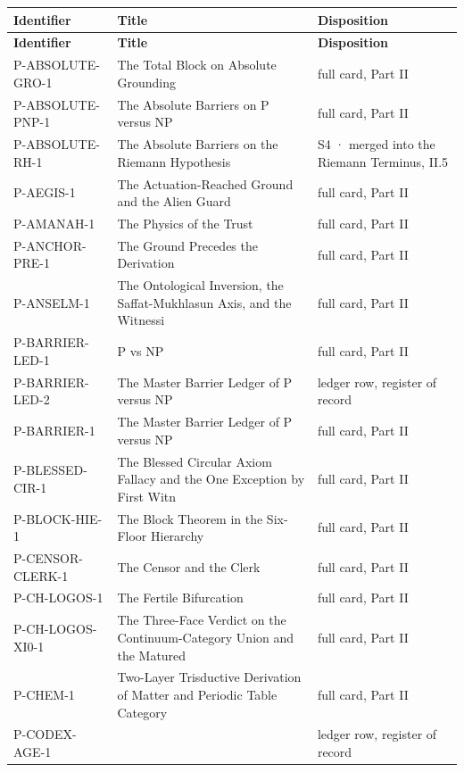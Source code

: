 \documentclass[10pt,twocolumn]{article}
\begin{document}
\begin{center}\small
\begin{longtable}{>{\raggedright\arraybackslash}p{}>{\raggedright\arraybackslash}p{}>{\raggedright\arraybackslash}p{}}
\toprule
\textbf{Identifier} & \textbf{Title} & \textbf{Disposition} \\
\midrule
\endfirsthead
\toprule
\textbf{Identifier} & \textbf{Title} & \textbf{Disposition} \\
\midrule
\endhead
\bottomrule
\endfoot
P-ABSOLUTE-GRO-1 & The Total Block on Absolute Grounding & full card, Part II \\
P-ABSOLUTE-PNP-1 & The Absolute Barriers on P versus NP & full card, Part II \\
P-ABSOLUTE-RH-1 & The Absolute Barriers on the Riemann Hypothesis & S4 · merged into the Riemann Terminus, II.5 \\
P-AEGIS-1 & The Actuation-Reached Ground and the Alien Guard & full card, Part II \\
P-AMANAH-1 & The Physics of the Trust & full card, Part II \\
P-ANCHOR-PRE-1 & The Ground Precedes the Derivation & full card, Part II \\
P-ANSELM-1 & The Ontological Inversion, the Saffat-Mukhlasun Axis, and the Witnessi & full card, Part II \\
P-BARRIER-LED-1 & P vs NP & full card, Part II \\
P-BARRIER-LED-2 & The Master Barrier Ledger of P versus NP & ledger row, register of record \\
P-BARRIER-1 & The Master Barrier Ledger of P versus NP & full card, Part II \\
P-BLESSED-CIR-1 & The Blessed Circular Axiom Fallacy and the One Exception by First Witn & full card, Part II \\
P-BLOCK-HIE-1 & The Block Theorem in the Six-Floor Hierarchy & full card, Part II \\
P-CENSOR-CLERK-1 & The Censor and the Clerk & full card, Part II \\
P-CH-LOGOS-1 & The Fertile Bifurcation & full card, Part II \\
P-CH-LOGOS-XI0-1 & The Three-Face Verdict on the Continuum-Category Union and the Matured & full card, Part II \\
P-CHEM-1 & Two-Layer Trisductive Derivation of Matter and Periodic Table Category & full card, Part II \\
P-CODEX-AGE-1 &  & ledger row, register of record \\

\end{longtable}
\end{center}
\end{document}
